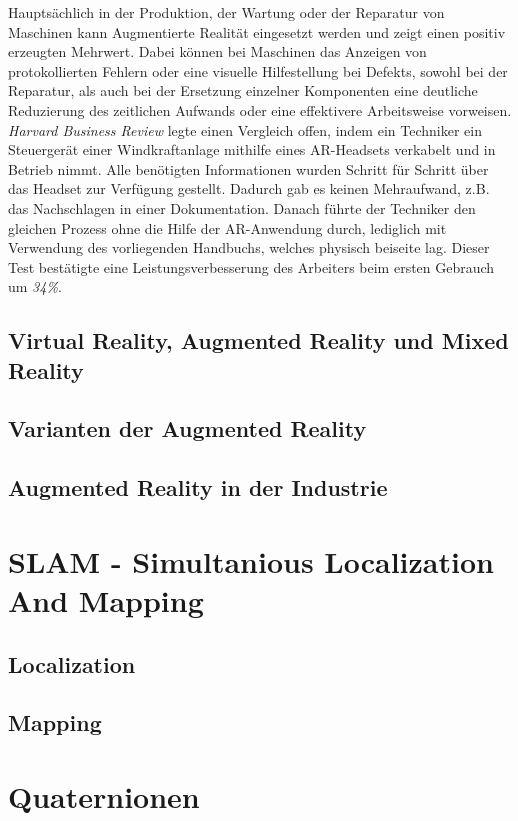 Hauptsächlich in der Produktion, der Wartung oder der Reparatur von Maschinen kann Augmentierte Realität eingesetzt werden und zeigt einen 
positiv erzeugten Mehrwert. Dabei können bei Maschinen das Anzeigen von protokollierten Fehlern oder eine visuelle Hilfestellung bei Defekts, sowohl bei der 
Reparatur, als auch bei der Ersetzung einzelner Komponenten eine deutliche Reduzierung des zeitlichen Aufwands oder eine effektivere Arbeitsweise 
vorweisen. 
\\
\textit{Harvard Business Review} legte einen Vergleich offen, indem ein Techniker ein Steuergerät einer Windkraftanlage mithilfe 
eines AR-Headsets verkabelt und in Betrieb nimmt. Alle benötigten Informationen wurden Schritt für Schritt über das Headset zur Verfügung 
gestellt. Dadurch gab es keinen Mehraufwand, z.B. das Nachschlagen in einer Dokumentation. Danach führte der Techniker den gleichen Prozess 
ohne die Hilfe der AR-Anwendung durch, lediglich mit Verwendung des vorliegenden Handbuchs, welches physisch beiseite lag.
Dieser Test bestätigte eine Leistungsverbesserung des Arbeiters beim ersten Gebrauch um \textit{34\%}.\cite{harvardbr.2017m}


\subsection{Virtual Reality, Augmented Reality und Mixed Reality}
\subsection{Varianten der Augmented Reality}
\subsection{Augmented Reality in der Industrie}

\section{SLAM - Simultanious Localization And Mapping}
\label{chap:SLAM}
\subsection{Localization}
\subsection{Mapping}

\section{Quaternionen}
\label{chap:Quaternionen}
